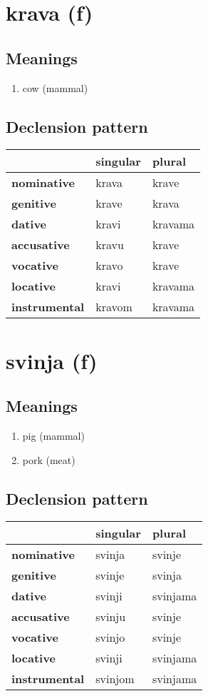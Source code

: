 \filbreak
\section{krava (f)}
\subsection*{Meanings}
\begin{enumerate}
\item cow (mammal)
\end{enumerate}
\subsection*{Declension pattern}
\begin{tabularx}{\linewidth}{Xll}
\toprule
{} & singular &   plural \\
\midrule
\textbf{nominative  } &    krava &    krave \\
\textbf{genitive    } &    krave &    krava \\
\textbf{dative      } &    kravi &  kravama \\
\textbf{accusative  } &    kravu &    krave \\
\textbf{vocative    } &    kravo &    krave \\
\textbf{locative    } &    kravi &  kravama \\
\textbf{instrumental} &   kravom &  kravama \\
\bottomrule
\end{tabularx}

\filbreak
\section{svinja (f)}
\subsection*{Meanings}
\begin{enumerate}
\item pig (mammal)
\item pork (meat)
\end{enumerate}
\subsection*{Declension pattern}
\begin{tabularx}{\linewidth}{Xll}
\toprule
{} & singular &    plural \\
\midrule
\textbf{nominative  } &   svinja &    svinje \\
\textbf{genitive    } &   svinje &    svinja \\
\textbf{dative      } &   svinji &  svinjama \\
\textbf{accusative  } &   svinju &    svinje \\
\textbf{vocative    } &   svinjo &    svinje \\
\textbf{locative    } &   svinji &  svinjama \\
\textbf{instrumental} &  svinjom &  svinjama \\
\bottomrule
\end{tabularx}

